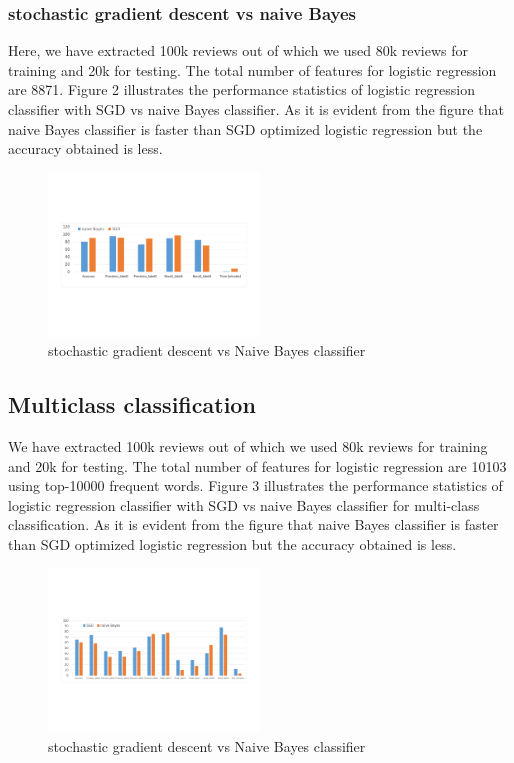 \documentclass{article}
\begin{document}
\subsubsection{stochastic gradient descent vs naive Bayes}
Here, we have extracted 100k reviews out of which we used 80k reviews for training and 20k for testing. The total number of features for logistic regression are 8871. Figure 2 illustrates the performance statistics of logistic regression classifier with SGD vs naive Bayes classifier.  As it is evident from the figure that naive Bayes classifier is faster than SGD optimized logistic regression but the accuracy obtained is less.
\begin{figure}[H]
  \caption{stochastic gradient descent vs Naive Bayes classifier}
  \centering
    \includegraphics[width=0.5\textwidth]{sgdvsbayes}
\end{figure}



\subsection{Multiclass classification}
We have extracted 100k reviews out of which we used 80k reviews for training and 20k for testing. The total number of features for logistic regression are 10103 using top-10000 frequent words. Figure 3 illustrates the performance statistics of logistic regression classifier with SGD vs naive Bayes classifier for multi-class classification.  As it is evident from the figure that naive Bayes classifier is faster than SGD optimized logistic regression but the accuracy obtained is less.

\begin{figure}[H]
  \caption{stochastic gradient descent vs Naive Bayes classifier}
  \centering
    \includegraphics[width=0.5\textwidth]{cropped_Book2}
\end{figure}
\end{document}
